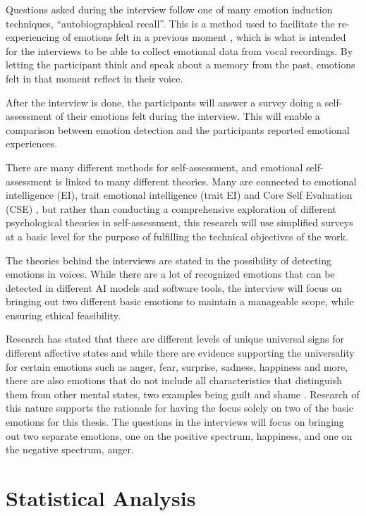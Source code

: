 Questions asked during the interview follow one of many emotion induction techniques, “autobiographical recall”. This is a method used to facilitate the re-experiencing of emotions felt in a previous moment \autocite{Siedlecka2019}, which is what is intended for the interviews to be able to collect emotional data from vocal recordings. By letting the participant think and speak about a memory from the past, emotions felt in that moment reflect in their voice.

 After the interview is done, the participants will answer a survey doing a self-assessment of their emotions felt during the interview. This will enable a comparison between emotion detection and the participants reported emotional experiences.

There are many different methods for self-assessment, and emotional self-assessment is linked to many different theories. Many are connected to emotional intelligence (EI), trait emotional intelligence (trait EI) and Core Self Evaluation (CSE) \autocite{Montasem2013}, but rather than conducting a comprehensive exploration of different psychological theories in self-assessment, this research will use simplified surveys at a basic level for the purpose of fulfilling the technical objectives of the work. 

 The theories behind the interviews are stated in the possibility of detecting emotions in voices. While there are a lot of recognized emotions that can be detected in different AI models and software tools, the interview will focus on bringing out two different basic emotions to maintain a manageable scope, while ensuring ethical feasibility.

Research has stated that there are different levels of unique universal signs for different affective states and while there are evidence supporting the universality for certain emotions such as anger, fear, surprise, sadness, happiness and more, there are also emotions that do not include all characteristics that distinguish them from other mental states, two examples being guilt and shame \autocite{Ekman2011}. Research of this nature supports the rationale for having the focus solely on two of the basic emotions for this thesis. The questions in the interviews will focus on bringing out two separate emotions, one on the positive spectrum, happiness, and one on the negative spectrum, anger.



\section{Statistical Analysis}
\label{sec:theo-stat-analyse}

